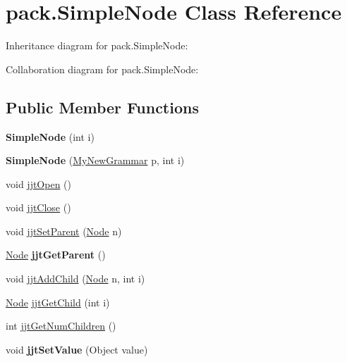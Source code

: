 \hypertarget{classpack_1_1_simple_node}{}\section{pack.\+Simple\+Node Class Reference}
\label{classpack_1_1_simple_node}


Inheritance diagram for pack.\+Simple\+Node\+:


Collaboration diagram for pack.\+Simple\+Node\+:
\subsection*{Public Member Functions}
\begin{DoxyCompactItemize}
\item 
{\bfseries Simple\+Node} (int i)\hypertarget{classpack_1_1_simple_node_ae171099d73c659bd5ff47973b450b3d3}{}\label{classpack_1_1_simple_node_ae171099d73c659bd5ff47973b450b3d3}

\item 
{\bfseries Simple\+Node} (\hyperlink{classpack_1_1_my_new_grammar}{My\+New\+Grammar} p, int i)\hypertarget{classpack_1_1_simple_node_aa7369d071158f6609541607dea075669}{}\label{classpack_1_1_simple_node_aa7369d071158f6609541607dea075669}

\item 
void \hyperlink{classpack_1_1_simple_node_a63a57095974d21b950870faf4f0d0301}{jjt\+Open} ()
\item 
void \hyperlink{classpack_1_1_simple_node_a5f272bda4f2f74f749dcf0ba8d86fcf1}{jjt\+Close} ()
\item 
void \hyperlink{classpack_1_1_simple_node_aa45f180756d00da5365794c9496f4fb8}{jjt\+Set\+Parent} (\hyperlink{interfacepack_1_1_node}{Node} n)
\item 
\hyperlink{interfacepack_1_1_node}{Node} {\bfseries jjt\+Get\+Parent} ()\hypertarget{classpack_1_1_simple_node_a89e86f2293d8a1a23ee487e375b86486}{}\label{classpack_1_1_simple_node_a89e86f2293d8a1a23ee487e375b86486}

\item 
void \hyperlink{classpack_1_1_simple_node_a06fa17840f33f2fbf99fd2d754aaae5c}{jjt\+Add\+Child} (\hyperlink{interfacepack_1_1_node}{Node} n, int i)
\item 
\hyperlink{interfacepack_1_1_node}{Node} \hyperlink{classpack_1_1_simple_node_a35eaf281dec92361730bd8362640c94e}{jjt\+Get\+Child} (int i)
\item 
int \hyperlink{classpack_1_1_simple_node_ad9d5ab808a21ac7ef4f4ad6638294a7d}{jjt\+Get\+Num\+Children} ()
\item 
void {\bfseries jjt\+Set\+Value} (Object value)\hypertarget{classpack_1_1_simple_node_a3e8a855e6f0505960338f67cae8e28ad}{}\label{classpack_1_1_simple_node_a3e8a855e6f0505960338f67cae8e28ad}


\end{DoxyCompactItemize}
